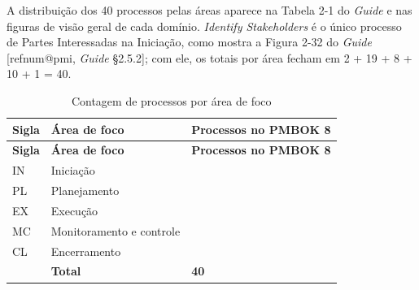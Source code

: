 \documentclass[11pt,a4paper]{article}
\makeatletter
\newcommand{\refnum}[1]{\csname refnum@#1\endcsname}
\newcommand{\cit}[1]{[\refnum{#1}]}
\newcommand{\SingleSpacing}{}
\newcommand{\fontetab}[1]{\par\vspace{3pt}{\small\noindent Fonte: #1\par}}
\makeatother
\begin{document}
A distribuição dos 40 processos pelas áreas aparece na Tabela 2-1 do \textit{Guide} e nas figuras de visão geral de cada domínio. \textit{Identify Stakeholders} é o único processo de Partes Interessadas na Iniciação, como mostra a Figura 2-32 do \textit{Guide} [\refnum{pmi}, \textit{Guide} §2.5.2]; com ele, os totais por área fecham em 2 + 19 + 8 + 10 + 1 = 40.

\begingroup\SingleSpacing\small
\begin{longtable}{@{}>{\raggedright\arraybackslash}p{1.6cm}>{\raggedright\arraybackslash}p{6.4cm}>{\centering\arraybackslash}p{3.2cm}@{}}
\caption{Contagem de processos por área de foco}\label{tab:t7}\\
\toprule
\textbf{Sigla} & \textbf{Área de foco} & \textbf{Processos no PMBOK 8}\\
\midrule
\endfirsthead
\toprule
\textbf{Sigla} & \textbf{Área de foco} & \textbf{Processos no PMBOK 8}\\
\midrule
\endhead
\bottomrule
\endfoot
\bottomrule
\endlastfoot
IN & Iniciação & 2\\[3pt]
PL & Planejamento & 19\\[3pt]
EX & Execução & 8\\[3pt]
MC & Monitoramento e controle & 10\\[3pt]
CL & Encerramento & 1\\[3pt]
\midrule
 & \textbf{Total} & \textbf{40}\\[3pt]
\end{longtable}
\endgroup
\fontetab{Elaborado pelos autores (2026), a partir de \cit{pmi}.}
\end{document}
